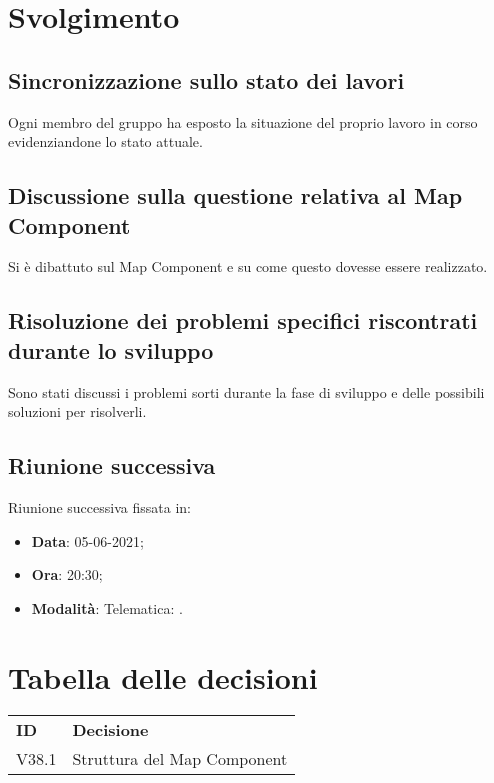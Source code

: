 \documentclass[]{article}
\begin{document}
	\newpage

	\section{Svolgimento}
		\subsection{Sincronizzazione sullo stato dei lavori}
		Ogni membro del gruppo ha esposto la situazione del proprio lavoro in corso evidenziandone lo stato attuale.\\
		
		\subsection{Discussione sulla questione relativa al Map Component}
		Si è dibattuto sul Map Component e su come questo dovesse essere realizzato. \\
		
		\subsection{Risoluzione dei problemi specifici riscontrati durante lo sviluppo}
		Sono stati discussi i problemi sorti durante la fase di sviluppo e delle possibili soluzioni per risolverli. \\
		
		\subsection{Riunione successiva}
		Riunione successiva fissata in:
		\begin{itemize}
			\item \textbf{Data}: 05-06-2021;
			\item \textbf{Ora}: 20:30;
			\item \textbf{Modalità}: Telematica: .
		\end{itemize}
	
	
\section{Tabella delle decisioni}

\begin{table} [h!]
	\begin{center}
		\begin{tabular} { m{2cm} m{14cm} }
			\rowcolor{lightgray}
			\textbf{ID} & \textbf{Decisione}\\
			V38.1 & Struttura del Map Component \glock{Typescript} \\
		\end{tabular}
	\end{center}
\end{table}
\end{document}
